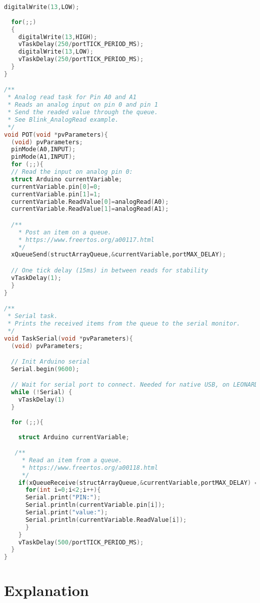 \documentclass{article}
\begin{document}
\begin{lstlisting}[language=C++,basicstyle=\ttfamily\footnotesize,keywordstyle=\color{blue},commentstyle=\color{gray},stringstyle=\color{red}]
  digitalWrite(13,LOW);
  
  for(;;)
  {
    digitalWrite(13,HIGH);
    vTaskDelay(250/portTICK_PERIOD_MS);
    digitalWrite(13,LOW);
    vTaskDelay(250/portTICK_PERIOD_MS);
  }
}

/**
 * Analog read task for Pin A0 and A1
 * Reads an analog input on pin 0 and pin 1 
 * Send the readed value through the queue.
 * See Blink_AnalogRead example.
 */
void POT(void *pvParameters){
  (void) pvParameters;
  pinMode(A0,INPUT);
  pinMode(A1,INPUT);
  for (;;){
  // Read the input on analog pin 0:
  struct Arduino currentVariable;
  currentVariable.pin[0]=0;
  currentVariable.pin[1]=1;
  currentVariable.ReadValue[0]=analogRead(A0);
  currentVariable.ReadValue[1]=analogRead(A1);  

  /**
    * Post an item on a queue.
    * https://www.freertos.org/a00117.html
    */
  xQueueSend(structArrayQueue,&currentVariable,portMAX_DELAY);

  // One tick delay (15ms) in between reads for stability
  vTaskDelay(1);
  }
}

/**
 * Serial task.
 * Prints the received items from the queue to the serial monitor.
 */
void TaskSerial(void *pvParameters){
  (void) pvParameters;

  // Init Arduino serial
  Serial.begin(9600);

  // Wait for serial port to connect. Needed for native USB, on LEONARDO, MICRO, YUN, and other 32u4 based boards.
  while (!Serial) {
    vTaskDelay(1)
  }
  
  for (;;){
    
    struct Arduino currentVariable;

   /**
     * Read an item from a queue.
     * https://www.freertos.org/a00118.html
     */
    if(xQueueReceive(structArrayQueue,&currentVariable,portMAX_DELAY) == pdPASS ){
      for(int i=0;i<2;i++){
      Serial.print("PIN:");
      Serial.println(currentVariable.pin[i]);
      Serial.print("value:");
      Serial.println(currentVariable.ReadValue[i]);
      }
    }
    vTaskDelay(500/portTICK_PERIOD_MS);
  }
}

\end{lstlisting}

\section*{Explanation}
\end{document}

